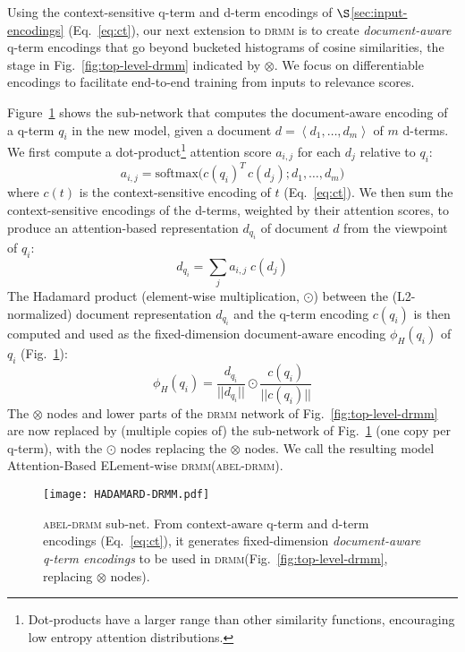 \documentclass[11pt,a4paper]{article}
\newcommand{\drmm}{\textsc{drmm}\xspace}
\newcommand{\abeldrmm}{\textsc{abel-drmm}\xspace}
\begin{document}
Using the context-sensitive q-term and d-term encodings of $\S$\ref{sec:input-encodings} (Eq.~\ref{eq:ct}), our next extension to \drmm is to create \emph{document-aware} q-term encodings that go beyond bucketed histograms of cosine similarities, the stage in Fig.~\ref{fig:top-level-drmm} indicated by $\otimes$. We focus on differentiable encodings to facilitate end-to-end training from inputs to relevance scores.

Figure~\ref{fig:hadamard-drmm} shows the sub-network that computes the document-aware encoding of a q-term $q_i$ in the new model, given a document $d = \left<d_1, \ldots, d_m\right>$ of $m$ d-terms. We first compute a dot-product\footnote{Dot-products have a larger range than other similarity functions, encouraging low entropy attention distributions.} attention score $a_{i,j}$ for each $d_j$ relative to $q_i$:
\begin{equation}
a_{i,j} = \textrm{softmax}\Big(c(q_i)^T \, c(d_j); d_1, \dots, d_m\Big)
\label{eq:dpattention}
\end{equation}
where $c(t)$ is the context-sensitive encoding of $t$ (Eq.~\ref{eq:ct}). We then sum the context-sensitive encodings of the d-terms, weighted by their attention scores, to produce an attention-based representation $d_{q_i}$ of document $d$ from the viewpoint of $q_i$:
\begin{equation}
d_{q_i} = \sum_j a_{i,j} \; c(d_j)
\label{eq:dqi}
\end{equation}
The Hadamard product (element-wise multiplication, $\odot$) between 
the (L2-normalized) document representation $d_{q_i}$ and the q-term encoding $c(q_i)$ is then computed and used as the fixed-dimension document-aware encoding $\phi_{H}(q_i)$ of $q_i$ (Fig.~\ref{fig:hadamard-drmm}):
\begin{equation}
\phi_{H}(q_i) = \frac{d_{q_i}}{||d_{q_i}||} \odot \frac{c(q_i)}{||c(q_i)||}
\label{eq:hadamard}
\end{equation}
The $\otimes$ nodes and lower parts of the \drmm network of Fig.~\ref{fig:top-level-drmm} are now replaced by (multiple copies of) the sub-network of Fig.~\ref{fig:hadamard-drmm} (one copy per q-term), with the $\odot$ nodes replacing the $\otimes$ nodes. We call the resulting model Attention-Based ELement-wise \drmm (\abeldrmm).

\begin{figure}[t]
\texttt{[image: HADAMARD-DRMM.pdf]}
\vspace{-0.12in}
\caption{\abeldrmm sub-net. From context-aware q-term and d-term encodings (Eq.~\ref{eq:ct}), it generates fixed-dimension \emph{document-aware q-term encodings} to be used in \drmm (Fig.~\ref{fig:top-level-drmm}, replacing $\otimes$ nodes).} 
\label{fig:hadamard-drmm}
\vspace{-4mm}
\end{figure}
\end{document}
